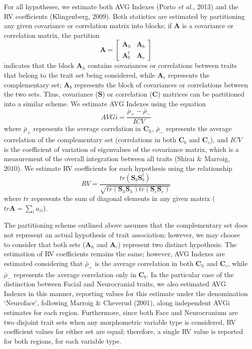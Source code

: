 \documentclass[12pt,]{article}
\begin{document}
For all hypotheses, we estimate both AVG Indexes (Porto \emph{et al.},
2013) and the RV coefficients (Klingenberg, 2009). Both statistics are
estimated by partitioning any given covariance or correlation matrix
into blocks; if $\mathbf{A}$ is a covariance or correlation matrix, the
partition \[
\mathbf{A} =
\begin{bmatrix}
\mathbf{A}_h & \mathbf{A}_b \\
\mathbf{A}^t_b & \mathbf{A}_c
\end{bmatrix}
\] indicates that the block $\mathbf{A}_h$ contains covariances or
correlations between traits that belong to the trait set being
considered, while $\mathbf{A}_c$ represents the complementary set;
$\mathbf{A}_b$ represents the block of covariances or correlations
between the two sets. Thus, covariance ($\mathbf{S}$) or correlation
($\mathbf{C}$) matrices can be partitioned into a similar scheme. We
estimate AVG Indexes using the equation \[
AVGi = \frac {\bar{\rho}_{+} - \bar{\rho}_{-}} {ICV}
\] where $\bar{\rho}_{+}$ represents the average correlation in
$\mathbf{C}_h$, $\bar{\rho}_{-}$ represents the average correlation of
the complementary set (correlations in both $\mathbf{C}_b$ and
$\mathbf{C}_c$), and $ICV$ is the coefficient of variation of
eigenvalues of the covariance matrix, which is a measurement of the
overall integration between all traits (Shirai \& Marroig, 2010). We
estimate RV coefficients for each hypothesis using the relationship \[
RV = \frac{tr(\mathbf{S}_{b}\mathbf{S}^t_{b})}{\sqrt{tr(\mathbf{S}_h \mathbf{S}_h)tr(\mathbf{S}_c \mathbf{S}_c)}}
\] where $tr$ represents the sum of diagonal elements in any given
matrix ($tr \mathbf{A} = \sum_i a_{ii}$).

The partitioning scheme outlined above assumes that the complementary
set does not represent an actual hypothesis of trait association;
however, we may choose to consider that both sets ($\mathbf{A}_h$ and
$\mathbf{A}_c$) represent two distinct hypothesis. The estimation of RV
coefficients remains the same; however, AVG Indexes are estimated
considering that $\bar{\rho}_{+}$ is the average correlation in both
$\mathbf{C}_h$ and $\mathbf{C}_c$, while $\bar{\rho}_{-}$ represents the
average correlation only in $\mathbf{C}_b$. In the particular case of
the distinction between Facial and Neurocranial traits, we also
estimated AVG Indexes in this manner, reporting values for this estimate
under the denomination `Neuroface', following Marroig \& Cheverud
(2001), along independent AVGi estimates for each region. Furthermore,
since both Face and Neurocranium are two disjoint trait sets when any
morphometric variable type is considered, RV coefficient values for
either set are equal; therefore, a single RV value is reported for both
regions, for each variable type.
\end{document}
